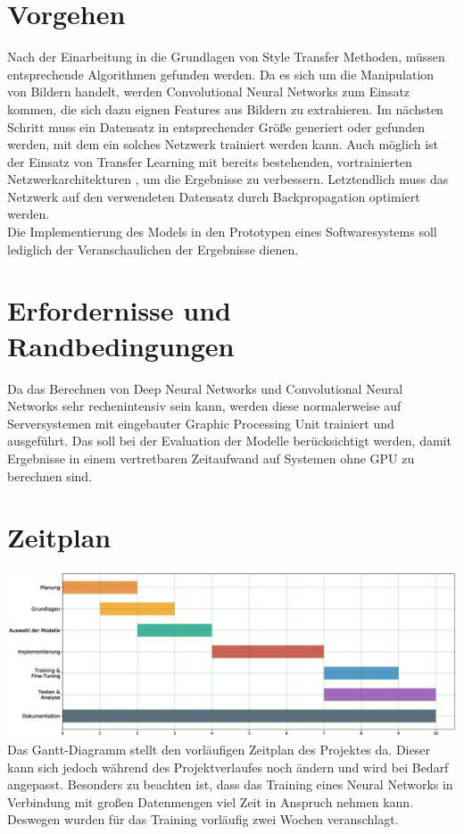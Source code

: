 \section{Vorgehen}
Nach der Einarbeitung in die Grundlagen von Style Transfer \cite{DBLP:journals/corr/GatysEB15a} \cite{DBLP:journals/corr/JohnsonAL16} Methoden,
müssen entsprechende Algorithmen gefunden werden. Da es sich um die Manipulation von Bildern handelt, werden Convolutional Neural Networks
\cite{lecun-gradientbased-learning-applied-1998} zum Einsatz kommen, die sich dazu eignen Features aus Bildern zu extrahieren. 
Im nächsten Schritt muss ein Datensatz in entsprechender Größe generiert oder gefunden werden, mit dem ein solches Netzwerk trainiert 
werden kann. Auch möglich ist der Einsatz von Transfer Learning mit bereits bestehenden, vortrainierten Netzwerkarchitekturen
\cite{DBLP:journals/corr/SimonyanZ14a}, um die Ergebnisse zu verbessern. Letztendlich muss das Netzwerk auf den verwendeten Datensatz durch
Backpropagation \cite{doi:10.1162/neco.1989.1.4.541} optimiert werden.
\\
Die Implementierung des Models in den Prototypen eines Softwaresystems soll lediglich der Veranschaulichen der Ergebnisse dienen.

\pagebreak

\section{Erfordernisse und Randbedingungen}
Da das Berechnen von Deep Neural Networks und Convolutional Neural Networks sehr rechenintensiv sein kann,
werden diese normalerweise auf Serversystemen mit eingebauter Graphic Processing Unit trainiert und ausgeführt. Das soll bei der Evaluation der 
Modelle berücksichtigt werden, damit Ergebnisse in einem vertretbaren Zeitaufwand auf Systemen ohne GPU zu berechnen sind.

\section{Zeitplan}
\includegraphics[width=1.00\textwidth]{resources/gantt.eps}
Das Gantt-Diagramm stellt den vorläufigen Zeitplan des Projektes da.
Dieser kann sich jedoch während des Projektverlaufes noch ändern und wird bei Bedarf angepasst.
Besonders zu beachten ist, dass das Training eines Neural Networks in Verbindung mit großen Datenmengen viel Zeit in Anspruch nehmen kann.
Deswegen wurden für das Training vorläufig zwei Wochen veranschlagt.

